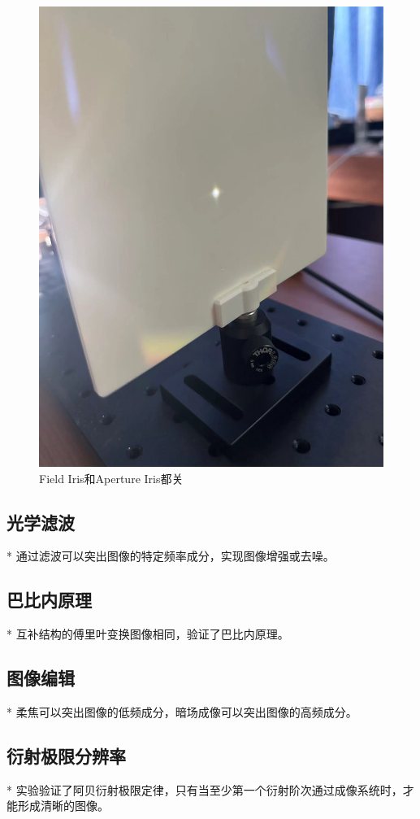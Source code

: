 \documentclass{ctexart}
\begin{document}
\begin{figure}[H]
\begin{minipage}[b]{0.2\textwidth}
    \includegraphics[width=\textwidth]{pictures/微信图片_20241010201025.jpg}
    \caption{Field Iris和Aperture Iris都关}
  \end{minipage}
\end{figure}
\subsection{光学滤波}
* 通过滤波可以突出图像的特定频率成分，实现图像增强或去噪。
\subsection{巴比内原理}
* 互补结构的傅里叶变换图像相同，验证了巴比内原理。
\subsection{图像编辑}
* 柔焦可以突出图像的低频成分，暗场成像可以突出图像的高频成分。
\subsection{衍射极限分辨率}
* 实验验证了阿贝衍射极限定律，只有当至少第一个衍射阶次通过成像系统时，才能形成清晰的图像。
\end{document}
